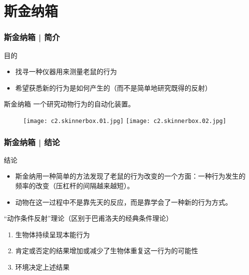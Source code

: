 \section{斯金纳箱}
\begin{frame}
  \frametitle{斯金纳箱 | 简介}
  \begin{block}{目的}
    \begin{itemize}
      \item 找寻一种仪器用来测量老鼠的行为
      \item 希望获悉新的行为是如何产生的（而不是简单地研究既得的反射）
    \end{itemize}
  \end{block}
  \pause
  \begin{block}{斯金纳箱}
    一个研究动物行为的自动化装置。
    \vspace{-1em}
  \begin{figure}
    \centering
    \texttt{[image: c2.skinnerbox.01.jpg]}\quad
    \texttt{[image: c2.skinnerbox.02.jpg]}
  \end{figure}
  \end{block}
\end{frame}

\begin{frame}
  \frametitle{斯金纳箱 | 结论}
  \begin{block}{结论}
    \begin{itemize}
      \item 斯金纳用一种简单的方法发现了老鼠的行为改变的一个方面：一种行为发生的频率的改变（压杠杆的间隔越来越短）。
      \item 动物在这一过程中不是靠先天的反应，而是靠学会了一种新的行为方式。
    \end{itemize}
  \end{block}
  \pause
  \begin{block}{“动作条件反射”理论（区别于巴甫洛夫的经典条件理论）}
    \begin{enumerate}
      \item 生物体持续呈现本能行为
      \item 肯定或否定的结果增加或减少了生物体重复这一行为的可能性
      \item 环境决定上述结果
    \end{enumerate}
  \end{block}
\end{frame}

